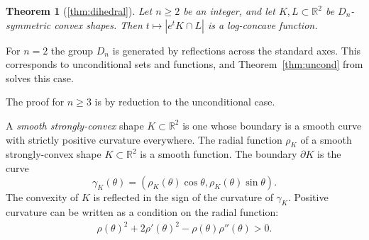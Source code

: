 \documentclass[a4paper,10pt,twoside,reqno,intlimits]{amsart}
\newtheorem*{theorem*}{Theorem}
\begin{document}
\begin{theorem*}[\ref{thm:dihedral}]
Let $n \ge 2$ be an integer, and let $K,L \subset {\mathbb{R}}^2$ be $D_n$-symmetric convex shapes.
Then $t \mapsto |e^t K \cap L|$ is a log-concave function.
\end{theorem*}

For $n=2$ the group $D_n$ is generated by reflections across the standard axes.
This corresponds to unconditional sets and functions,
and Theorem~\ref{thm:uncond} from \cite{bconj} solves this case.

The proof for $n \ge 3$ is by reduction to the unconditional case.

A \emph{smooth strongly-convex} shape $K \subset {\mathbb{R}}^2$ is one whose boundary is
a smooth curve with strictly positive curvature everywhere.
The radial function $\rho_K$ of a smooth strongly-convex shape $K \subset {\mathbb{R}}^2$ is a smooth function.
The boundary ${\partial K}$ is the curve
$$ \gamma_K(\theta) = \left( \rho_K(\theta) \cos \theta, \rho_K(\theta) \sin \theta \right) . $$
The convexity of $K$ is reflected in the sign of the curvature of $\gamma_K$.
Positive curvature can be written as a condition on the radial function:
\begin{align}
\rho(\theta)^2 + 2\rho'(\theta)^2 - \rho(\theta) \rho''(\theta) > 0 .
\label{eq:curv}
\end{align}
\end{document}
